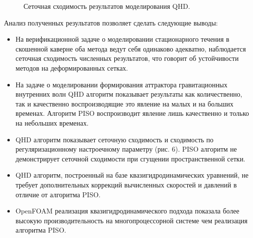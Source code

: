 \documentclass[utf8x]{G7-32} %
\begin{document}
\begin{figure}[hbt!]
    \centering
        
    \caption{
      Сеточная сходимость результатов моделирования QHD.
    }
    \label{fig:AdamsBashforthEulerNek3D}
\end{figure}

Анализ полученных результатов позволяет сделать следующие выводы:
\begin{itemize}
    \item На верификационной задаче о моделировании стационарного течения в скошенной каверне оба метода ведут себя одинаково адекватно, наблюдается сеточная сходимость численных результатов, что говорит об устойчивости методов на деформированных сетках.
    \item На задаче о моделировании формирования аттрактора гравитационных внутренних волн QHD алгоритм показывает результаты как количественно, так и качественно воспроизводящие это явление на малых и на больших временах. Алгоритм PISO воспроизводит явление лишь качественно и только на небольших временах.
    \item QHD алгоритм показывает сеточную сходимость и сходимость по регуляризационному настроечному параметру (рис. 6). PISO алгоритм не демонстрирует сеточной сходимости при сгущении пространственной сетки.
    \item QHD алгоритм, построенный на базе квазигидродинамических уравнений, не требует дополнительных коррекций вычисленных скоростей и давлений в отличие от алгоритма PISO.
    \item OpenFOAM реализация квазигидродинамического подхода показала более высокую производительность на многопроцессорной системе чем реализация алгоритма PISO.
\end{itemize}
\end{document}
